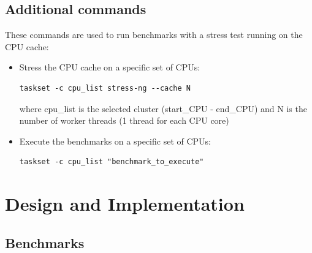 \subsection{Additional commands}

These commands are used to run benchmarks with a stress test running on the CPU cache:

\begin{itemize}
	\item Stress the CPU cache on a specific set of CPUs:\begin{verbatim}taskset -c cpu_list stress-ng --cache N \end{verbatim} where cpu\_list is the selected cluster (start\_CPU - end\_CPU) and N is the number of worker threads (1 thread for each CPU core)
	\item Execute the benchmarks on a specific set of CPUs: \begin{verbatim}taskset -c cpu_list "benchmark_to_execute"\end{verbatim}
\end{itemize}
\clearpage
\section{Design and Implementation}

\subsection{Benchmarks}

